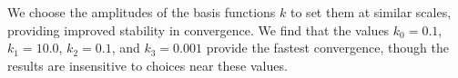 \documentclass[modern]{aastex62}
\begin{document}
We choose the amplitudes of the basis functions $k$ to set them at similar scales, providing improved stability in convergence.
We find that the values $k_0=0.1$, $k_1=10.0$, $k_2=0.1$, and $k_3=0.001$ provide the fastest convergence, though the results are insensitive to choices near these values.


% 
%

\end{document}
